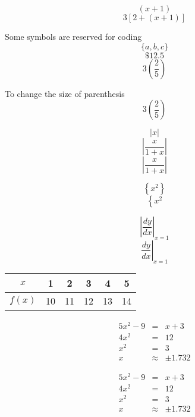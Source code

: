 \documentclass[11pt]{article}
\begin{document}
$$(x+1)$$
$$3[2+(x+1)]$$

Some symbols are reserved for coding
$$\{a,b,c\}$$
$$\$12.5$$
$$3(\frac{2}{5})$$

To change the size of parenthesis
$$3\left(\frac{2}{5}\right)$$

$$|x|$$
$$|\frac{x}{1+x}|$$
$$\left|\frac{x}{1+x}\right|$$

$$\left\{x^2\right\}$$
$$\left\{x^2\right.$$

$$\left|\frac{dy}{dx}\right|_{x=1}$$
$$\left.\frac{dy}{dx}\right|_{x=1}$$

\begin{tabular}{|c|c|c|c|c|c|}
\hline
$x$ & 1 & 2 & 3 & 4 & 5 \\ \hline
$f\left(x\right)$ & 10 & 11 & 12 & 13 & 14\\
\hline
\end{tabular}

\begin{eqnarray*}
5x^2-9&=&x+3 \\
4x^2&=&12\\
x^2&=&3\\
x&\approx&\pm1.732
\end{eqnarray*}

\begin{eqnarray}
5x^2-9&=&x+3 \\
4x^2&=&12\\
x^2&=&3\\
x&\approx&\pm1.732
\end{eqnarray}
\end{document}
